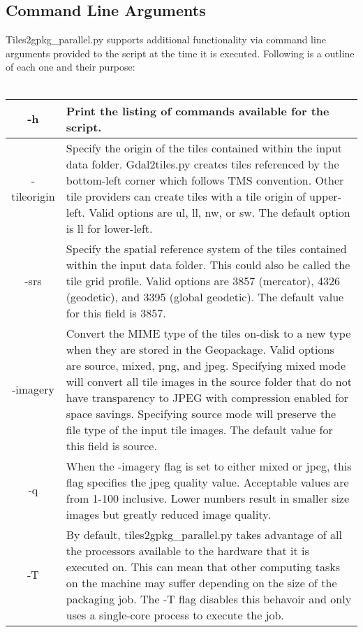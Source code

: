 \documentclass{article}
\begin{document}
\subsection{Command Line Arguments}
Tiles2gpkg\_parallel.py supports additional functionality via command line
arguments provided to the script at the time it is executed.  Following is a
outline of each one and their purpose:
\\\\
\begin{tabular}{ | c | p{14cm} | }
    \hline
    -h & Print the listing of commands available for the script.\\
    \hline
    -tileorigin & Specify the origin of the tiles contained within the input
    data folder.  Gdal2tiles.py creates tiles referenced by the bottom-left
    corner which follows TMS convention.  Other tile providers can create tiles
    with a tile origin of upper-left.  Valid options are ul, ll, nw, or sw.
    The default option is ll for lower-left.\\
    \hline
    -srs & Specify the spatial reference system of the tiles contained within
    the input data folder.  This could also be called the tile grid profile.
    Valid options are 3857 (mercator), 4326 (geodetic), and 3395 (global
    geodetic).  The default value for this field is 3857.\\
    \hline
    -imagery & Convert the MIME type of the tiles on-disk to a new type when
    they are stored in the Geopackage.  Valid options are source, mixed, png,
    and jpeg.  Specifying mixed mode will convert all tile images in the source
    folder that do not have transparency to JPEG with compression enabled for
    space savings.  Specifying source mode will preserve the file type of the
    input tile images.  The default value for this field is source.\\
    \hline
    -q & When the -imagery flag is set to either mixed or jpeg, this flag
    specifies the jpeg quality value.  Acceptable values are from 1-100
    inclusive.  Lower numbers result in smaller size images but greatly reduced
    image quality.\\
    \hline
    -T & By default, tiles2gpkg\_parallel.py takes advantage of all the
    processors available to the hardware that it is executed on.  This can mean
    that other computing tasks on the machine may suffer depending on the size
    of the packaging job. The -T flag disables this behavoir and only uses a
    single-core process to execute the job.\\
    \hline
\end{tabular}
\end{document}
